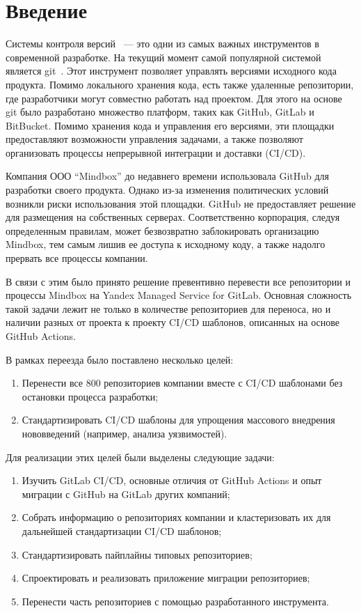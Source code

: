 \chapter*{Введение}

Системы контроля версий~\cite{vcs} — это одни из самых важных инструментов в современной разработке.
На текущий момент самой популярной системой является git~\cite{git}.
Этот инструмент позволяет управлять версиями исходного кода продукта.
Помимо локального хранения кода, есть также удаленные репозитории, где разработчики могут совместно работать над проектом.
Для этого на основе git было разработано множество платформ, таких как GitHub\cite{github}, GitLab\cite{gitlab} и BitBucket\cite{bitbucket}.
Помимо хранения кода и управления его версиями, эти площадки предоставляют возможности управления задачами,
а также позволяют организовать процессы непрерывной интеграции и доставки (CI/CD)\cite{ci-cd}.

Компания ООО \enquote{Mindbox}\cite{mindbox} до недавнего времени использовала GitHub для разработки своего продукта.
Однако из-за изменения политических условий возникли риски использования этой площадки.
GitHub не предоставляет решение для размещения на собственных серверах.
Соответственно корпорация, следуя определенным правилам, может безвозвратно заблокировать организацию Mindbox,
тем самым лишив ее доступа к исходному коду, а также надолго прервать все процессы компании.

В связи с этим было принято решение превентивно перевести все репозитории и процессы Mindbox на Yandex Managed Service for GitLab.
Основная сложность такой задачи лежит не только в количестве репозиториев для переноса,
но и наличии разных от проекта к проекту CI/CD шаблонов, описанных на основе GitHub Actions.

В рамках переезда было поставлено несколько целей:
\begin{enumerate}
  \item Перенести все 800 репозиториев компании вместе с CI/CD шаблонами без остановки процесса разработки;
  \item Стандартизировать CI/CD шаблоны для упрощения массового внедрения нововведений (например, анализа уязвимостей).
\end{enumerate}

Для реализации этих целей были выделены следующие задачи:
\begin{enumerate}
  \item Изучить GitLab CI/CD, основные отличия от GitHub Actions и опыт миграции с GitHub на GitLab других компаний;
  \item Собрать информацию о репозиториях компании и кластеризовать их для дальнейшей стандартизации CI/CD шаблонов;
  \item Стандартизировать пайплайны типовых репозиториев;
  \item Спроектировать и реализовать приложение миграции репозиториев;
  \item Перенести часть репозиториев с помощью разработанного инструмента.
\end{enumerate}
